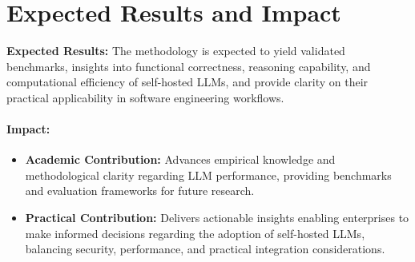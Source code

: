 \section{Expected Results and Impact}
\label{sec:expected-results-and-impact}

\textbf{Expected Results:} The methodology is expected to yield validated benchmarks, insights into functional correctness, reasoning capability, and computational efficiency of self-hosted LLMs, and provide clarity on their practical applicability in software engineering workflows.

\paragraph{Impact:}


\begin{itemize}
    \item \textbf{Academic Contribution:} Advances empirical knowledge and methodological clarity regarding LLM performance, providing benchmarks and evaluation frameworks for future research.
    \item \textbf{Practical Contribution:} Delivers actionable insights enabling enterprises to make informed decisions regarding the adoption of self-hosted LLMs, balancing security, performance, and practical integration considerations.
\end{itemize}